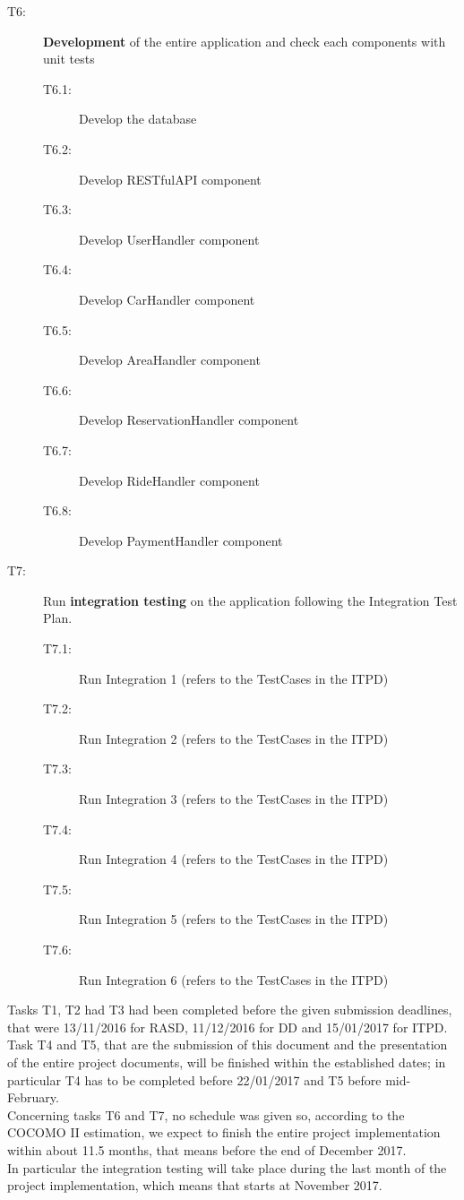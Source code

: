 \begin{description}
	\item[T6:] \textbf{Development} of the entire application and check each components with unit tests
	\begin{description}
		\item[T6.1:] Develop the database
		\item[T6.2:] Develop RESTfulAPI component
		\item[T6.3:] Develop UserHandler component
		\item[T6.4:] Develop CarHandler component
		\item[T6.5:] Develop AreaHandler component
		\item[T6.6:] Develop ReservationHandler component
		\item[T6.7:] Develop RideHandler component
		\item[T6.8:] Develop PaymentHandler component
	\end{description}
	
	\item[T7:] Run \textbf{integration testing} on the application following the Integration Test Plan.
	\begin{description}
		\item[T7.1:] Run Integration 1 (refers to the TestCases in the ITPD)
		\item[T7.2:] Run Integration 2 (refers to the TestCases in the ITPD)
		\item[T7.3:] Run Integration 3 (refers to the TestCases in the ITPD)
		\item[T7.4:] Run Integration 4 (refers to the TestCases in the ITPD)
		\item[T7.5:] Run Integration 5 (refers to the TestCases in the ITPD)
		\item[T7.6:] Run Integration 6 (refers to the TestCases in the ITPD)
	\end{description}
	
\end{description}
Tasks T1, T2 had T3 had been completed before the given submission deadlines, that were 13/11/2016 for RASD, 11/12/2016 for DD and 15/01/2017 for ITPD. \\
Task T4 and T5, that are the submission of this document and the presentation of the entire project documents, will be finished within the established dates; in particular T4 has to be completed before 22/01/2017 and T5 before mid-February. \\
Concerning tasks T6 and T7, no schedule was given so, according to the COCOMO II estimation, we expect to finish the entire project implementation within about 11.5 months, that means before the end of December 2017. \\ In particular the integration testing will take place during the last month of the project implementation, which means that starts at November 2017.
